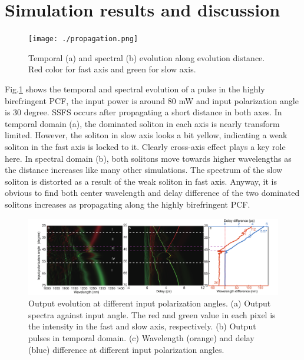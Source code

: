 \documentclass{osa-article}
\begin{document}
\section{Simulation results and discussion}

\begin{figure}[htbp]
    \centering%
    \texttt{[image: ./propagation.png]}
    \caption{Temporal (a) and spectral (b) evolution along evolution distance. Red color for fast axis and green for slow axis.}
    \label{fig_propagation}\vspace*{-6pt}
\end{figure}
 
Fig.\ref{fig_propagation} shows the temporal and spectral evolution of a pulse in the highly birefringent PCF, the input power is around 80 mW and input polarization angle is 30 degree. SSFS occurs after propagating a short distance in both axes. In temporal domain (a), the dominated soliton in each axis is nearly transform limited. However, the soliton in slow axis looks a bit yellow, indicating a weak soliton in the fast axis is locked to it. Clearly cross-axis effect plays a key role here. In spectral domain (b), both solitons move towards higher wavelengths as the distance increases like many other simulations\cite{dudley_supercontinuum_2006}. The spectrum of the slow soliton is distorted as a result of the weak soliton in fast axis. Anyway, it is obvious to find both center wavelength and delay difference of the two dominated solitons increases as propagating along the highly birefringent PCF.

\begin{figure}[htbp]
\centering%
\includegraphics[width=\textwidth]{fig_sim.pdf}
\caption{Output evolution at different input polarization angles. (a) Output spectra against input angle. The red and green value in each pixel is the intensity in the fast and slow axis, respectively. (b) Output pulses in temporal domain. (c) Wavelength (orange) and delay (blue) difference at different input polarization angles.}
\label{fig_C}\vspace*{-6pt}
\end{figure}
\end{document}
